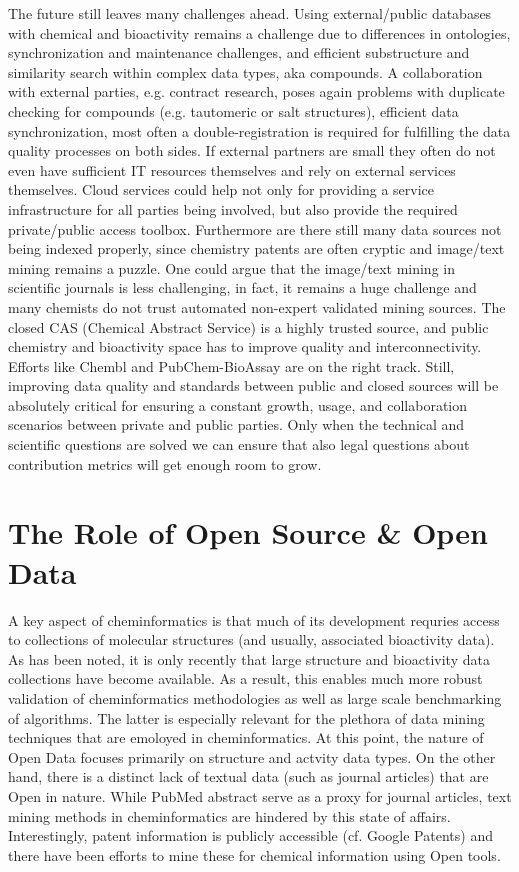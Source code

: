 \documentclass{sig-alternate}
\begin{document}
The future still leaves many challenges ahead. Using external/public databases
with chemical and bioactivity remains a challenge due to differences in
ontologies, synchronization and maintenance challenges, and efficient
substructure and similarity search within complex data types, aka compounds. A
collaboration with external parties, e.g. contract research, poses again
problems with duplicate checking for compounds (e.g. tautomeric or salt
structures), efficient data synchronization, most often a double-registration is
required for fulfilling the data quality processes on both sides. If external
partners are small they often do not even have sufficient IT resources
themselves and rely on external services themselves. Cloud services could help
not only for providing a service infrastructure for all parties being involved,
but also provide the required private/public access toolbox. Furthermore are
there still many data sources not being indexed properly, since chemistry
patents are often cryptic and image/text mining remains a puzzle. One could
argue that the image/text mining in scientific journals is less challenging, in
fact, it remains a huge challenge and many chemists do not trust automated
non-expert validated mining sources. The closed CAS (Chemical Abstract Service)
is a highly trusted source, and public chemistry and bioactivity space has to
improve quality and interconnectivity. Efforts like Chembl and PubChem-BioAssay
are on the right track. Still, improving data quality and standards between
public and closed sources will be absolutely critical for ensuring a constant
growth, usage, and collaboration scenarios between private and public parties.
Only when the technical and scientific questions are solved we can ensure that
also legal questions about contribution metrics will get enough room to grow.

\section{The Role of Open Source \& Open Data}
\label{sec:role-open-source}

A key aspect of cheminformatics is that much of its development
requries access to collections of molecular structures (and usually,
associated bioactivity data). As has been noted, it is only recently
that large structure and bioactivity data collections have become
available. As a result, this enables much more robust validation of
cheminformatics methodologies as well as large scale benchmarking of
algorithms. The latter is especially relevant for the plethora of
data mining techniques that are emoloyed in cheminformatics. At this
point, the nature of Open Data focuses primarily on structure and
actvity data types. On the other hand, there is a distinct lack of
textual data (such as journal articles) that are Open in nature. While
PubMed abstract serve as a proxy for journal articles, text mining
methods in cheminformatics are hindered by this state of affairs.
Interestingly, patent information is publicly accessible (cf. Google
Patents) and there have been efforts to mine these for chemical
information using Open tools.
\end{document}
